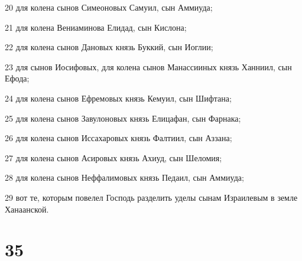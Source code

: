 \par 20 для колена сынов Симеоновых Самуил, сын Аммиуда;
\par 21 для колена Вениаминова Елидад, сын Кислона;
\par 22 для колена сынов Дановых князь Буккий, сын Иоглии;
\par 23 для сынов Иосифовых, для колена сынов Манассииных князь Ханниил, сын Ефода;
\par 24 для колена сынов Ефремовых князь Кемуил, сын Шифтана;
\par 25 для колена сынов Завулоновых князь Елицафан, сын Фарнака;
\par 26 для колена сынов Иссахаровых князь Фалтиил, сын Аззана;
\par 27 для колена сынов Асировых князь Ахиуд, сын Шеломия;
\par 28 для колена сынов Неффалимовых князь Педаил, сын Аммиуда;
\par 29 вот те, которым повелел Господь разделить уделы сынам Израилевым в земле Ханаанской.

\chapter{35}


